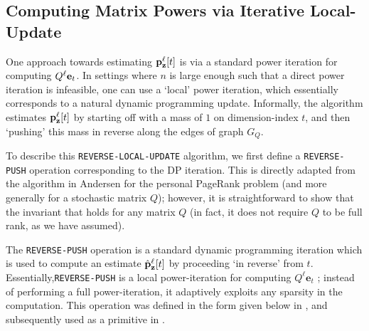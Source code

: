 

\subsection{Computing Matrix Powers via Iterative Local-Update}
\label{ssec:reverse}

One approach towards estimating ${\mathbf{p}}_\mathbf{z}^{\ell}[t]$ is via a standard power iteration for computing $Q^{\ell}\mathbf{e}_t$. 
In settings where $n$ is large enough such that a direct power iteration is infeasible, one can use a `local' power iteration, which essentially corresponds to a natural dynamic programming update. Informally, the algorithm estimates ${\mathbf{p}}_\mathbf{z}^{\ell}[t]$ by starting off with a mass of $1$ on dimension-index $t$, and then `pushing' this mass in reverse along the edges of graph $G_Q$. 

To describe this \texttt{REVERSE-LOCAL-UPDATE} algorithm, we first define a \texttt{REVERSE-PUSH} operation corresponding to the DP iteration. 
This is directly adapted from the algorithm in Andersen \cite{andersen2007local} for the personal PageRank problem (and more generally for a stochastic matrix $Q$); however, it is straightforward to show that the invariant that holds for any matrix $Q$ (in fact, it does not require $Q$ to be full rank, as we have assumed).
 
The \texttt{REVERSE-PUSH} operation is a standard dynamic programming iteration which is used to compute an estimate $\hat{\mathbf{p}}_\mathbf{z}^{\ell}[t]$ by proceeding `in reverse' from $t$. 
Essentially,\texttt{REVERSE-PUSH} is a local power-iteration for computing $Q^{\ell}\mathbf{e}_t$ ; instead of performing a full power-iteration, it adaptively exploits any sparsity in the computation.
This operation was defined in the form given below in \cite{andersen2007local}, and subsequently used as a primitive in \cite{banerjee2015fast, lee2014asynchronous}.



